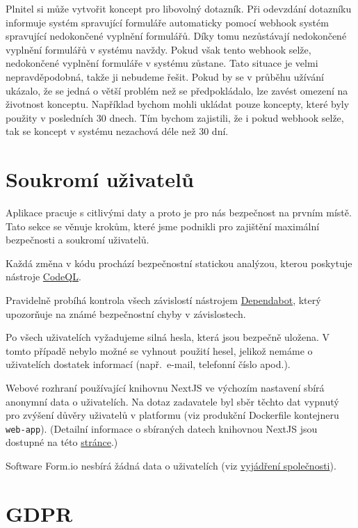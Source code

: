 Plnitel si může vytvořit koncept pro libovolný dotazník.
Při odevzdání dotazníku informuje systém spravující formuláře automaticky pomocí webhook systém spravující nedokončené vyplnění formulářů.
Díky tomu nezůstávají nedokončené vyplnění formulářů v systému navždy.
Pokud však tento webhook selže, nedokončené vyplnění formuláře v systému zůstane.
Tato situace je velmi nepravděpodobná, takže ji nebudeme řešit.
Pokud by se v průběhu užívání ukázalo, že se jedná o větší problém než se předpokládalo, lze zavést omezení na životnost konceptu.
Například bychom mohli ukládat pouze koncepty, které byly použity v posledních 30 dnech.
Tím bychom zajistili, že i pokud webhook selže, tak se koncept v systému nezachová déle než 30 dní.


\section{Soukromí uživatelů}\label{sec:soukromi-uzivatelu}

Aplikace pracuje s citlivými daty a proto je pro nás bezpečnost na prvním místě.
Tato sekce se věnuje krokům, které jsme podnikli pro zajištění maximální bezpečnosti a soukromí uživatelů.

Každá změna v kódu prochází bezpečnostní statickou analýzou, kterou poskytuje nástroje \href{https://codeql.github.com/}{CodeQL}.

Pravidelně probíhá kontrola všech závislostí nástrojem \href{https://github.com/dependabot}{Dependabot}, který upozorňuje na známé bezpečnostní chyby v závislostech.

Po všech uživatelích vyžadujeme silná hesla, která jsou bezpečně uložena.
V tomto případě nebylo možné se vyhnout použití hesel, jelikož nemáme o uživatelích dostatek informací (např.\ e-mail, telefonní číslo apod.).

Webové rozhraní používající knihovnu NextJS ve výchozím nastavení sbírá anonymní data o uživatelích.
Na dotaz zadavatele byl sběr těchto dat vypnutý pro zvýšení důvěry uživatelů v platformu (viz produkční Dockerfile kontejneru \texttt{web-app}).
(Detailní informace o sbíraných datech knihovnou NextJS jsou dostupné na této \href{https://nextjs.org/telemetry}{stránce}.)

Software Form.io nesbírá žádná data o uživatelích (viz \href{https://github.com/formio/formio/issues/1499}{vyjádření společnosti}).


\section{GDPR}\label{sec:gdpr}

